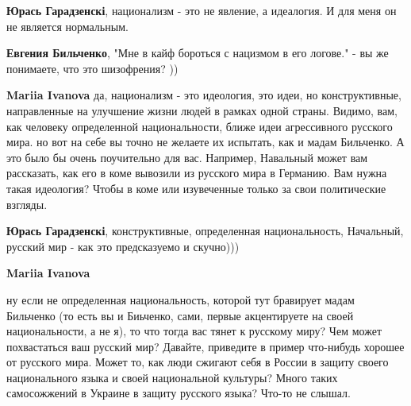 \begin{itemize}
\begin{itemize}
\textbf{Юрась Гарадзенскі}, национализм - это не явление, а идеалогия. И для меня он не является нормальным.

 
\textbf{Евгения Бильченко}, "Мне в кайф бороться с нацизмом в его логове." - вы же понимаете, что это шизофрения? ))

 
\textbf{Mariia Ivanova} да, национализм - это идеология, это идеи, но конструктивные, направленные на улучшение жизни людей в рамках одной страны. Видимо, вам, как человеку определенной национальности, ближе идеи агрессивного русского мира. но вот на себе вы точно не желаете их испытать, как и мадам Бильченко. А это было бы очень поучительно для вас. Например, Навальный может вам рассказать, как его в коме вывозили из русского мира в Германию. Вам нужна такая идеология? Чтобы в коме или изувеченные только за свои политические взгляды.

 
\textbf{Юрась Гарадзенскі}, конструктивные, определенная национальность, Начальный, русский мир - как это предсказуемо и скучно)))

 
\textbf{Mariia Ivanova} 

ну если не определенная национальность, которой тут бравирует мадам Бильченко
(то есть вы и Биьченко, сами, первые акцентируете на своей национальности, а не
я), то что тогда вас тянет к русскому миру? Чем может похвастаться ваш русский
мир? Давайте, приведите в пример что-нибудь хорошее от русского мира. Может то,
как люди сжигают себя в России в защиту своего национального языка и своей
национальной культуры? Много таких самосожжений в Украине в защиту русского
языка? Что-то не слышал.


\end{itemize}
\end{itemize}
